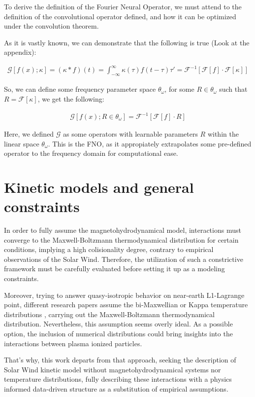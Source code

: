 \documentclass[12pt]{article}
\begin{document}
To derive the definition of the Fourier Neural Operator, we must attend to the definition of the convolutional operator defined, and how it can be optimized under the convolution theorem.

As it is vastly known, we can demonstrate that the following is true (Look at the appendix):

\begin{align*}
    \mathcal{G}[ f(x); \kappa ] = (\kappa * f)(t) = \int_{-\infty}^\infty \kappa(\tau)f(t-\tau)\tau' = \mathcal{F}^{-1}[\mathcal{F}[f] \cdot \mathcal{F}[\kappa]]
\end{align*}

So, we can define some frequency parameter space $\theta_\omega$, for some $R \in \theta_\omega$ such that $R = \mathcal{F}[\kappa]$, we get the following:

\begin{align*}
    \mathcal{G}[ f(x); R \in \theta_\omega] = \mathcal{F}^{-1}[\mathcal{F}[f] \cdot R]
\end{align*}

Here, we defined $\mathcal{G}$ as some operators with learnable parameters $R$ within the linear space $\theta_\omega$. This is the FNO, as it appropiately extrapolates some pre-defined operator to the frequency domain for computational ease.


\section{Kinetic models and general constraints}
In order to fully assume the magnetohydrodynamical model, interactions must converge to the Maxwell-Boltzmann thermodynamical distribution for certain conditions, implying a high colisionality degree, contrary to empirical observations of the Solar Wind. Therefore, the utilization of such a constrictive framework must be carefully evaluated before setting it up as a modeling constraints.

Moreover, trying to answer quasy-isotropic behavior on near-earth L1-Lagrange point, different research papers assume the bi-Maxwellian or Kappa temperature distributions \cite{Stansby_2018, Nicolaou_2018, Zouganelis_2004}, carrying out the Maxwell-Boltzmann thermodynamical distribution. Nevertheless, this assumption seems overly ideal. As a possible option, the inclusion of numerical distributions could bring insights into the interactions between plasma ionized particles.

That's why, this work departs from that approach, seeking the description of Solar Wind kinetic model without magnetohydrodynamical systems nor temperature distributions, fully describing these interactions with a physics informed data-driven structure as a substitution of empirical assumptions.
\end{document}
